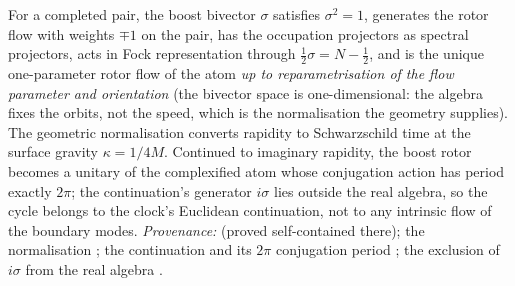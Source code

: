 For a completed pair, the boost bivector $\sigma$ satisfies $\sigma^2 = 1$, generates the rotor flow with weights $\mp 1$ on the pair, has the occupation projectors as spectral projectors, acts in Fock representation through $\tfrac12\sigma = N - \tfrac12$, and is the unique one-parameter rotor flow of the atom \emph{up to reparametrisation of the flow parameter and orientation} (the bivector space is one-dimensional: the algebra fixes the orbits, not the speed, which is the normalisation the geometry supplies). The geometric normalisation converts rapidity to Schwarzschild time at the surface gravity $\kappa = 1/4M$. Continued to imaginary rapidity, the boost rotor becomes a unitary of the complexified atom whose conjugation action has period exactly $2\pi$; the continuation's generator $i\sigma$ lies outside the real algebra, so the cycle belongs to the clock's Euclidean continuation, not to any intrinsic flow of the boundary modes. \emph{Provenance:} \cite[Prop.~2.1]{ButlerT7} (proved self-contained there); the normalisation \cite[App.~A]{ButlerT5}; the continuation and its $2\pi$ conjugation period \cite[Prop.~7.21(1)]{ButlerT5}; the exclusion of $i\sigma$ from the real algebra \cite[Prop.~7.21(3)]{ButlerT5}.
